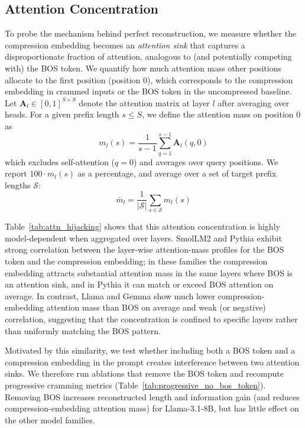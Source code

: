 \subsection{Attention Concentration}
\label{app:attention_concentration}

To probe the mechanism behind perfect reconstruction, we measure whether the compression embedding becomes an \emph{attention sink} that captures a disproportionate fraction of attention, analogous to (and potentially competing with) the BOS token.
We quantify how much attention mass other positions allocate to the first position (position $0$), which corresponds to the compression embedding in crammed inputs or the BOS token in the uncompressed baseline.
Let $\mathbf{A}_l \in [0,1]^{S \times S}$ denote the attention matrix at layer $l$ after averaging over heads.
For a given prefix length $s \le S$, we define the attention mass on position $0$ as
%
\begin{equation}
    m_l(s) = \frac{1}{s-1} \sum_{q=1}^{s-1} \mathbf{A}_l(q, 0)
\end{equation}
%
which excludes self-attention ($q=0$) and averages over query positions.
We report $100 \cdot m_l(s)$ as a percentage, and average over a set of target prefix lengths $\mathcal{S}$:
%
\begin{equation}
    \bar{m}_l = \frac{1}{|\mathcal{S}|} \sum_{s \in \mathcal{S}} m_l(s)
\end{equation}

Table~\ref{tab:attn_hijacking} shows that this attention concentration is highly model-dependent when aggregated over layers.
SmolLM2 and Pythia exhibit strong correlation between the layer-wise attention-mass profiles for the BOS token and the compression embedding; in these families the compression embedding attracts substantial attention mass in the same layers where BOS is an attention sink, and in Pythia it can match or exceed BOS attention on average.
In contrast, Llama and Gemma show much lower compression-embedding attention mass than BOS on average and weak (or negative) correlation, suggesting that the concentration is confined to specific layers rather than uniformly matching the BOS pattern.

Motivated by this similarity, we test whether including both a BOS token and a compression embedding in the prompt creates interference between two attention sinks.
We therefore run ablations that remove the BOS token and recompute progressive cramming metrics (Table~\ref{tab:progressive_no_bos_token}).
Removing BOS increases reconstructed length and information gain (and reduces compression-embedding attention mass) for Llama-3.1-8B, but has little effect on the other model families.

